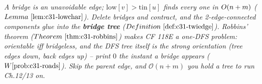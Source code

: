 \begin{recallbox}
\emph{A bridge is an unavoidable edge; \(\mathrm{low}[v]>\mathrm{tin}[u]\) finds every one in
\(O(n+m)\) (\(\lemref{c31-lowchar}\)).  Delete bridges and contract, and the
2-edge-connected components glue into the \textbf{bridge tree} (\(\defref{c31-twiedge}\)).
Robbins' theorem (\(\thmref{c31-robbins}\)) makes CF 118E a one-DFS problem: orientable iff
bridgeless, and the DFS tree itself is the strong orientation (tree edges down, back edges up)
-- print \(0\) the instant a bridge appears (\(\probref{c31-roads}\)).  Skip the parent
\emph{edge}, and \(\mathcal{O}(n+m)\) you hold a tree to run Ch.12/13 on.}
\end{recallbox}
